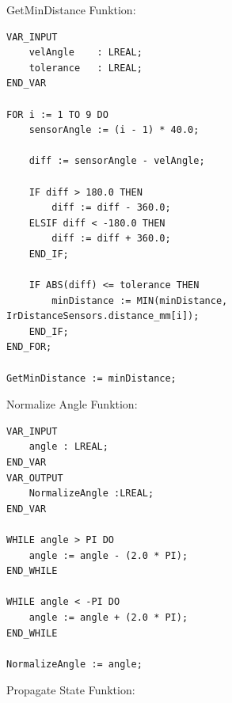 \newpage
GetMinDistance Funktion:
\begin{verbatim}
VAR_INPUT
    velAngle    : LREAL;
    tolerance   : LREAL;
END_VAR

FOR i := 1 TO 9 DO
    sensorAngle := (i - 1) * 40.0;

    diff := sensorAngle - velAngle;

    IF diff > 180.0 THEN
        diff := diff - 360.0;
    ELSIF diff < -180.0 THEN
        diff := diff + 360.0;
    END_IF;

    IF ABS(diff) <= tolerance THEN
        minDistance := MIN(minDistance, IrDistanceSensors.distance_mm[i]);
    END_IF;
END_FOR;

GetMinDistance := minDistance;
\end{verbatim}
\newpage
Normalize Angle Funktion:
\begin{verbatim}
VAR_INPUT
	angle : LREAL;
END_VAR
VAR_OUTPUT
	NormalizeAngle :LREAL;
END_VAR

WHILE angle > PI DO
    angle := angle - (2.0 * PI);
END_WHILE

WHILE angle < -PI DO
    angle := angle + (2.0 * PI);
END_WHILE

NormalizeAngle := angle;
\end{verbatim}
\newpage
Propagate State Funktion:
